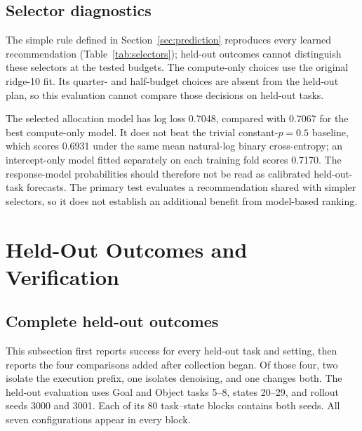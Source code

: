 \documentclass{article}
\begin{document}
\subsection{Selector diagnostics}

The simple rule defined in Section~\ref{sec:prediction} reproduces every learned
recommendation (Table~\ref{tab:selectors});
held-out outcomes cannot distinguish these selectors at the tested budgets.
The compute-only choices use the original ridge-10 fit. Its quarter- and
half-budget choices are absent from the held-out plan, so this evaluation
cannot compare those decisions on held-out tasks.

The selected allocation model has log loss 0.7048, compared with 0.7067 for the
best compute-only model. It does not beat the trivial constant-$p=0.5$ baseline,
which scores 0.6931 under the same mean natural-log binary cross-entropy; an
intercept-only model fitted separately on
each training fold scores 0.7170. The response-model probabilities should
therefore not be read as calibrated held-out-task forecasts. The primary test
evaluates a recommendation shared with simpler selectors, so it does not
establish an additional benefit from model-based ranking.


\FloatBarrier
\section{Held-Out Outcomes and Verification}
\label{app:held-out-details}

\subsection{Complete held-out outcomes}
\label{app:confirmation-details}

This subsection first reports success for every held-out task and setting, then
reports the four comparisons added after collection began. Of those four, two
isolate the execution prefix, one isolates denoising, and one changes both.
The held-out evaluation uses Goal and Object tasks 5--8, states 20--29, and
rollout seeds 3000 and 3001. Each of its 80 task--state blocks contains both
seeds. All seven configurations appear in every block.

\begin{table}[htbp]
\centering\small
\caption{Held-out successes by task and configuration. Each task row has
20 attempts: ten paired initial states, each with two rollout seeds. The total
aggregates 160 attempts per configuration. The primary
$(2,2)$ setting exceeds $(2,5)$ on seven tasks and ties on one.}
\label{tab:primary-tasks}
\label{tab:confirmation-tasks}

\end{table}
\end{document}
